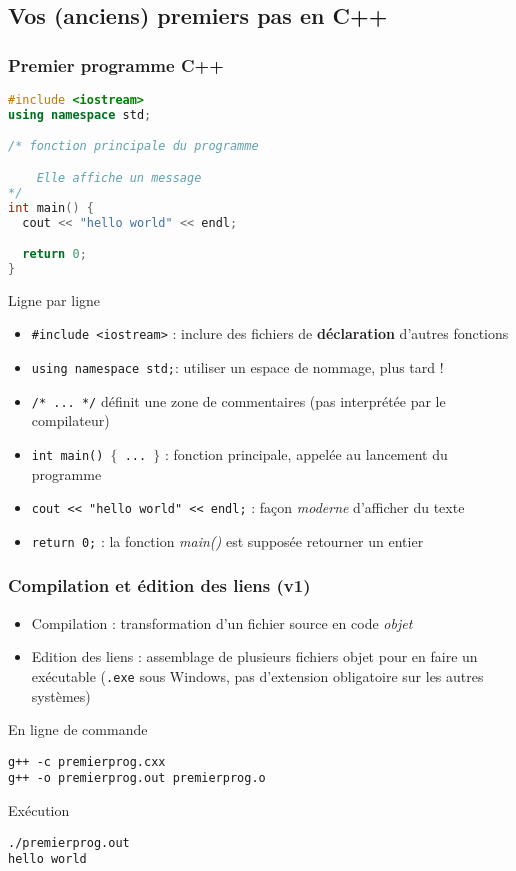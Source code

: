 \subsection{Vos (anciens) premiers pas en C++}

\begin{frame}[fragile]
\frametitle{Premier programme C++}
\begin{lstlisting}[language=C++]
#include <iostream>
using namespace std;

/* fonction principale du programme

	Elle affiche un message
*/
int main() {
  cout << "hello world" << endl;

  return 0;
}
\end{lstlisting}
\end{frame}

\begin{frame}{Ligne par ligne}
\begin{itemize}
\item \texttt{\#include <iostream>} : inclure des fichiers de \textbf{déclaration} d'autres fonctions
\item \texttt{using namespace std;}: utiliser un espace de nommage, plus tard !
\item \texttt{/* ... */} définit une zone de commentaires (pas interprétée par le compilateur)
\item \texttt{int main() $\{$ ... $\}$} : fonction principale, appelée au lancement du programme
\item \texttt{cout << "hello world" << endl;} : façon \textit{moderne} d'afficher du texte
\item \texttt{return 0;} : la fonction \textit{main()} est supposée retourner un entier
\end{itemize}
\end{frame}

\begin{frame}[fragile]
\frametitle{Compilation et édition des liens (v1)}
\begin{itemize}
\item Compilation : transformation d'un fichier source en code \textit{objet}
\item Edition des liens : assemblage de plusieurs fichiers objet pour en faire un exécutable (\texttt{.exe} sous Windows, pas d'extension obligatoire sur les autres systèmes)
\end{itemize}
\pause \begin{block}{En ligne de commande}
\begin{verbatim}
g++ -c premierprog.cxx
g++ -o premierprog.out premierprog.o
\end{verbatim}
\end{block}

\pause \begin{exampleblock}{Exécution}
\begin{verbatim}
./premierprog.out
hello world
\end{verbatim}
\end{exampleblock}
\end{frame}

